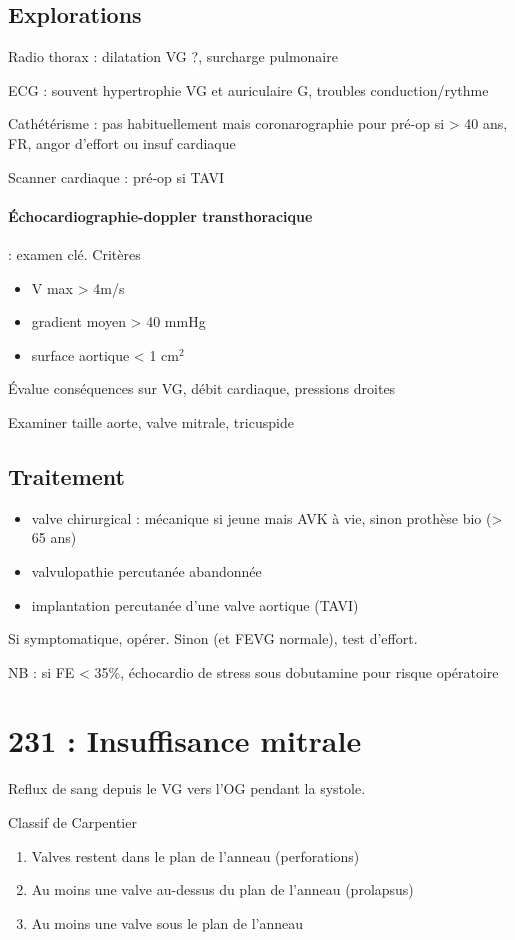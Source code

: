 \documentclass{article}
\begin{document}
\subsection{Explorations}
Radio thorax : dilatation VG ?, surcharge pulmonaire

ECG : souvent hypertrophie VG et auriculaire G, troubles conduction/rythme

Cathétérisme : pas habituellement mais coronarographie pour pré-op si \male > 40 ans, FR, angor d'effort ou insuf
cardiaque

Scanner cardiaque : pré-op si \gls{TAVI}

\paragraph{Échocardiographie-doppler transthoracique} : examen clé. Critères
\begin{itemize}
  \item V max > 4m/s
  \item gradient moyen > 40 mmHg
  \item surface aortique < 1 $\text{cm}^2$
\end{itemize}
Évalue conséquences sur VG, débit cardiaque, pressions droites

Examiner taille aorte, valve mitrale, tricuspide

\subsection{Traitement}
\begin{itemize}
  \item valve chirurgical : mécanique si jeune mais AVK à vie, sinon prothèse bio (> 65
    ans)
  \item valvulopathie percutanée abandonnée
  \item implantation percutanée d'une valve aortique (TAVI)
\end{itemize}
Si symptomatique, opérer. Sinon (et FEVG normale), test d'effort.

NB : si FE < 35\%, échocardio de stress sous dobutamine pour risque opératoire


\section{231 : Insuffisance mitrale}%
\label{sec:231_insuffisance_mitrale}
Reflux de sang depuis le VG vers l'OG pendant la systole.

Classif de Carpentier
\begin{enumerate}[label=\Roman*]
  \item Valves restent dans le plan de l'anneau (perforations)
  \item Au moins une valve au-dessus du plan de l'anneau (prolapsus)
  \item Au moins une valve sous le plan de l'anneau
\end{enumerate}
\end{document}
